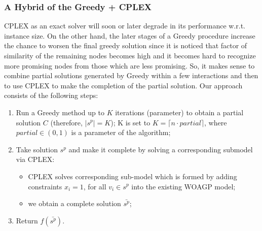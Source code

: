 \documentclass[runningheads,a4paper]{elsarticle}
\begin{document}
	\subsubsection{A Hybrid of the Greedy + CPLEX} 
	CPLEX as an exact solver will soon or later degrade in its performance w.r.t. instance size. On the other hand, the later stages of a Greedy procedure increase the chance to worsen the final greedy solution since it is noticed that factor of similarity of the remaining nodes becomes high and it becomes hard to recognize more promising nodes from those which are less promising.  So, it makes sense to combine  partial solutions generated by  Greedy within a few interactions and then to use CPLEX to make the completion of the partial solution. Our approach consists of the following steps:
	\begin{enumerate}
		\item Run a Greedy method up to $K$ iterations (parameter) to obtain a partial solution $C$ (therefore, $|s^p| = K$); K is set to $K=\lceil n \cdot partial \rceil$, where $partial \in (0, 1)$ is a parameter of the algorithm;
		\item Take solution $s^p$ and make it complete by solving a corresponding submodel via CPLEX:
		\begin{itemize}
			\item CPLEX solves corresponding sub-model which is formed by adding constraints $x_{i} = 1$, for all $v_i \in s^p$ into the existing WOAGP model;
			\item we obtain a complete solution $\bar {s^p}$;
		\end{itemize}
		\item Return $f(\bar {s^p})$.
	\end{enumerate}
	
	\begin{comment}
	
	\noindent \textbf{Improvements of the above method.} The above method can serve as a basic iteration
	of a more advanced techniques like ILP-LNS or CMSA. In this case, methods for destructing the solutions
	has to be proposed.  Underlying idea could be:
	\begin{itemize}
	\item remove $N$ guards with the largest costs out of $C'$
	\item remove $N$ guards which have a higher amount of points from $D(P)$ covered by other guards, represented by the function
	\begin{align}
	ratio(i) = \frac{\sum_{v \in V\setminus{ \{i\}}, j \in V(i)} 1_{j \mbox{ is veasible from } v} }{|V(i)|}.
	\end{align}
	\end{itemize}
	\end{comment}
	
\end{document}

